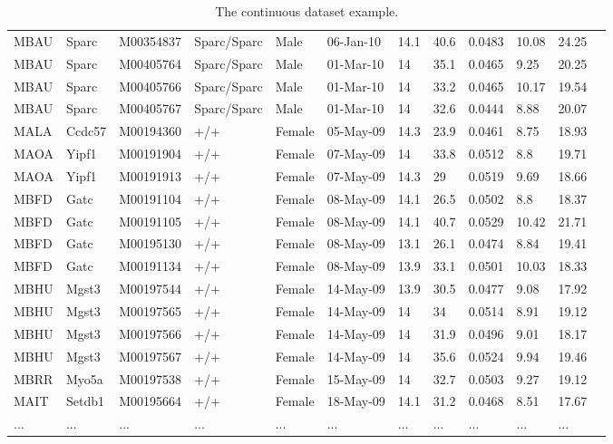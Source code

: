 \documentclass[12pt,a4paper]{article}
\begin{document}
\begin{table}
\begin{tabular}{| p{13mm} | p{13mm} | l | l | l | p{19mm}| p{12mm} | l | p{13mm} | p{12mm} | p{12mm} | l |}
MBAU&Sparc&M00354837&Sparc/Sparc&Male&06-Jan-10&14.1&40.6&0.0483&10.08&24.25&\\
MBAU&Sparc&M00405764&Sparc/Sparc&Male&01-Mar-10&14&35.1&0.0465&9.25&20.25&\\
MBAU&Sparc&M00405766&Sparc/Sparc&Male&01-Mar-10&14&33.2&0.0465&10.17&19.54&\\
MBAU&Sparc&M00405767&Sparc/Sparc&Male&01-Mar-10&14&32.6&0.0444&8.88&20.07&\\
MALA&Ccdc57&M00194360&+/+&Female&05-May-09&14.3&23.9&0.0461&8.75&18.93&\\
MAOA&Yipf1&M00191904&+/+&Female&07-May-09&14&33.8&0.0512&8.8&19.71&\\
MAOA&Yipf1&M00191913&+/+&Female&07-May-09&14.3&29&0.0519&9.69&18.66&\\
MBFD&Gatc&M00191104&+/+&Female&08-May-09&14.1&26.5&0.0502&8.8&18.37&\\
MBFD&Gatc&M00191105&+/+&Female&08-May-09&14.1&40.7&0.0529&10.42&21.71&\\
MBFD&Gatc&M00195130&+/+&Female&08-May-09&13.1&26.1&0.0474&8.84&19.41&\\
MBFD&Gatc&M00191134&+/+&Female&08-May-09&13.9&33.1&0.0501&10.03&18.33&\\
MBHU&Mgst3&M00197544&+/+&Female&14-May-09&13.9&30.5&0.0477&9.08&17.92&\\
MBHU&Mgst3&M00197565&+/+&Female&14-May-09&14&34&0.0514&8.91&19.12&\\
MBHU&Mgst3&M00197566&+/+&Female&14-May-09&14&31.9&0.0496&9.01&18.17&\\
MBHU&Mgst3&M00197567&+/+&Female&14-May-09&14&35.6&0.0524&9.94&19.46&\\
MBRR&Myo5a&M00197538&+/+&Female&15-May-09&14&32.7&0.0503&9.27&19.12&\\
MAIT&Setdb1&M00195664&+/+&Female&18-May-09&14.1&31.2&0.0468&8.51&17.67&\\
...&...&...&...&...&...&...&...&...&...&...&\\
\hline  
\end{tabular}
\caption{The continuous dataset example.}\label{table:01}
\end{table}
\end{document}
